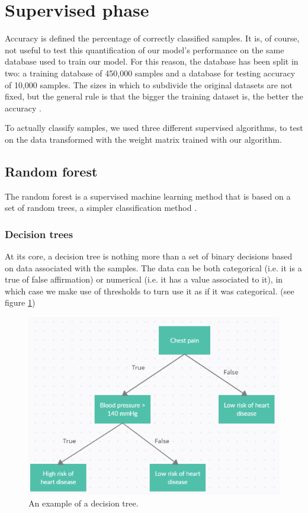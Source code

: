 \documentclass[a4paper]{report}
\begin{document}
\section{Supervised phase}
Accuracy is defined the percentage of correctly classified samples.
It is, of course, not useful to test this quantification of our model's performance on the same database used to train our model.
For this reason, the database has been split in two:
a training database of 450,000 samples and a database for testing accuracy of 10,000 samples.
The sizes in which to subdivide the original datasets are not fixed, but the general rule is that the bigger the training dataset is, the better the accuracy \cite{bishop2006pattern}.

To actually classify samples, we used three different supervised algorithms, to test on the data transformed with the weight matrix trained with our algorithm.

\subsection{Random forest}
The random forest is a supervised machine learning method that is based on a set of random trees, a simpler classification method \cite{breiman2001random}.

\subsubsection{Decision trees}
 At its core, a decision tree is nothing more than a set of binary decisions based on data associated with the samples.
The data can be both categorical (i.e.  it is a true of false affirmation) or numerical (i.e.  it has a value associated to it), in which case we make use of thresholds to turn use it as if it was categorical.
(see figure \ref{chestt})

\begin{figure} [H]
    \centering
    \includegraphics [width=12cm] {o/chestt.png}
    \caption{An example of a decision tree.}
    \label{chestt}
\end{figure}
\end{document}
